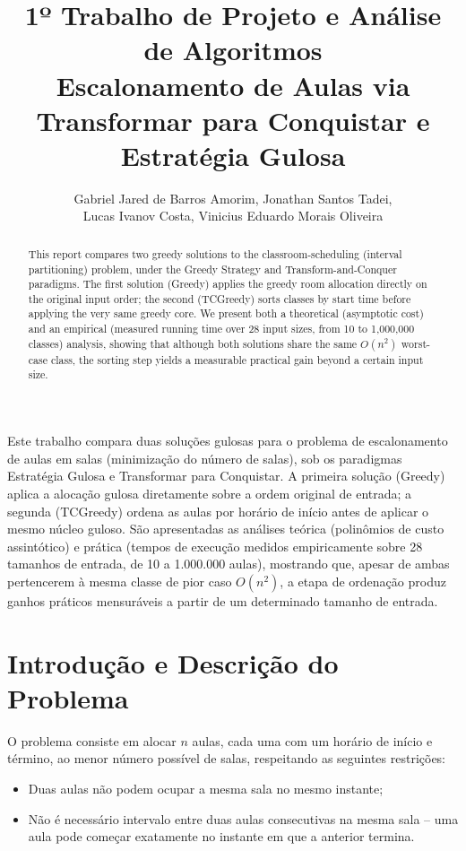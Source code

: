 \documentclass[12pt]{article}
\title{1º Trabalho de Projeto e Análise de Algoritmos\\
  Escalonamento de Aulas via Transformar para Conquistar e Estratégia Gulosa}
\author{Gabriel Jared de Barros Amorim, Jonathan Santos Tadei,\\
  Lucas Ivanov Costa, Vinicius Eduardo Morais Oliveira}
\begin{document}
\maketitle

\begin{abstract}
  This report compares two greedy solutions to the classroom-scheduling
  (interval partitioning) problem, under the Greedy Strategy and
  Transform-and-Conquer paradigms. The first solution (Greedy) applies the
  greedy room allocation directly on the original input order; the second
  (TCGreedy) sorts classes by start time before applying the very same
  greedy core. We present both a theoretical (asymptotic cost) and an
  empirical (measured running time over 28 input sizes, from 10 to
  1,000,000 classes) analysis, showing that although both solutions share
  the same $O(n^2)$ worst-case class, the sorting step yields a
  measurable practical gain beyond a certain input size.
\end{abstract}

\begin{resumo}
  Este trabalho compara duas soluções gulosas para o problema de
  escalonamento de aulas em salas (minimização do número de salas), sob os
  paradigmas Estratégia Gulosa e Transformar para Conquistar. A primeira
  solução (Greedy) aplica a alocação gulosa diretamente sobre a ordem
  original de entrada; a segunda (TCGreedy) ordena as aulas por horário de
  início antes de aplicar o mesmo núcleo guloso. São apresentadas as
  análises teórica (polinômios de custo assintótico) e prática (tempos de
  execução medidos empiricamente sobre 28 tamanhos de entrada, de 10 a
  1.000.000 aulas), mostrando que, apesar de ambas pertencerem à mesma
  classe de pior caso $O(n^2)$, a etapa de ordenação produz ganhos
  práticos mensuráveis a partir de um determinado tamanho de entrada.
\end{resumo}

\section{Introdução e Descrição do Problema}

O problema consiste em alocar $n$ aulas, cada uma com um horário de início e
término, ao menor número possível de salas, respeitando as seguintes
restrições:
\begin{itemize}
\item Duas aulas não podem ocupar a mesma sala no mesmo instante;
\item Não é necessário intervalo entre duas aulas consecutivas na mesma
  sala -- uma aula pode começar exatamente no instante em que a anterior
  termina.
\end{itemize}
\end{document}
